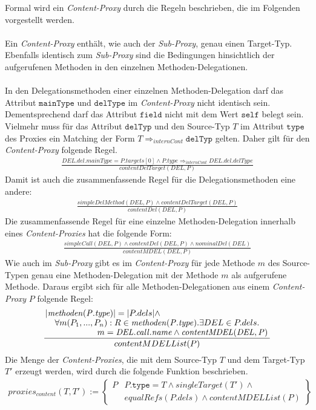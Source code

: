 \documentclass[a4paper,12pt]{article}
\begin{document}
Formal wird ein \emph{Content-Proxy} durch die Regeln beschrieben, die im Folgenden vorgestellt werden.\\\\
Ein \emph{Content-Proxy} enthält, wie auch der \emph{Sub-Proxy}, genau einen Target-Typ. Ebenfalls identisch zum \emph{Sub-Proxy} sind die Bedingungen hinsichtlich der aufgerufenen Methoden in den einzelnen Methoden-Delegationen.\\\\
In den Delegationsmethoden einer einzelnen Methoden-Delegation darf das Attribut $\texttt{mainType}$ und $\texttt{delType}$ im \emph{Content-Proxy} nicht identisch sein. Dementsprechend darf das Attribut $\texttt{field}$ nicht mit dem Wert $\texttt{self}$ belegt sein. Vielmehr muss für das Attribut $\texttt{delTyp}$ und den Source-Typ $T$ im Attribut $\texttt{type}$ des Proxies ein Matching der Form $T \Rightarrow_{internCont} \texttt{delTyp}$ gelten. Daher gilt für den \emph{Content-Proxy} folgende Regel.
\begin{gather*}
\frac{\mathit{DEL.del.mainType} = \mathit{P.targets[0]} \wedge \mathit{P.type} \Rightarrow_{internCont} \mathit{DEL.del.delType}}
{\mathit{contentDelTarget(DEL,P)}}
\end{gather*}
\noindent
Damit ist auch die zusammenfassende Regel für die Delegationsmethoden eine andere:
\begin{gather*}
\frac{\mathit{simpleDelMethod(DEL,P)} \wedge \mathit{contentDelTarget(DEL,P)}}
{contentDel(DEL,P)}
\end{gather*}
Die zusammenfassende Regel für eine einzelne Methoden-Delegation innerhalb eines \emph{Content-Proxies} hat die folgende Form:
\begin{gather*}
\frac{\mathit{simpleCall(DEL,P)} \wedge \mathit{contentDel(DEL,P) \wedge \mathit{nominalDel(DEL)}}}
{contentMDEL(DEL,P)}
\end{gather*}
Wie auch im \emph{Sub-Proxy} gibt es im \emph{Content-Proxy} für jede Methode $m$ des Source-Typen genau eine Methoden-Delegation mit der Methode $m$ als aufgerufene Methode. Daraus ergibt sich für alle Methoden-Delegationen aus einem \emph{Content-Proxy} $P$ folgende Regel:
\begin{gather*}
\frac{\splitfrac{|\mathit{methoden(P.type)}| = |P.dels| \wedge}{ \splitfrac{\forall m(P_1,...,P_n):R \in \mathit{methoden(P.type)}.\exists DEL \in P.dels.}{m = \mathit{DEL.call.name} \wedge \mathit{contentMDEL(DEL,P)}
 }}
}
{contentMDELList(P)}
\end{gather*}
Die Menge der \emph{Content-Proxies}, die mit dem Source-Typ $T$ und dem Target-Typ $T'$ erzeugt werden, wird durch die folgende Funktion beschrieben.
\begin{gather*}
\mathit{proxies_{content}(T,T')} := 
\left\{\begin{array}{l|l}
	P	& P\texttt{.type} = T \wedge  \mathit{singleTarget(T')} \wedge \mathit{ }\\
		& \mathit{equalRefs(P.dels)} \wedge \mathit{contentMDELList(P)} 
		 \end{array}
\right\}
\end{gather*}
\end{document}
